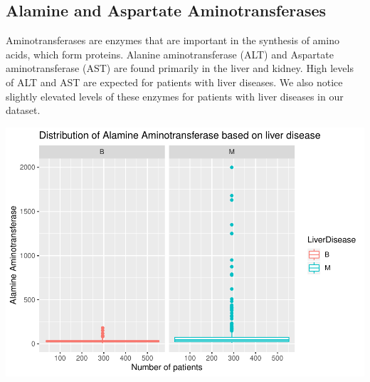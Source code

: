 \documentclass[]{article}
\newenvironment{Shaded}{\begin{snugshade}}{\end{snugshade}}
\newcommand{\CommentTok}[1]{\textcolor[rgb]{0.56,0.35,0.01}{\textit{#1}}}
\newcommand{\DataTypeTok}[1]{\textcolor[rgb]{0.13,0.29,0.53}{#1}}
\newcommand{\KeywordTok}[1]{\textcolor[rgb]{0.13,0.29,0.53}{\textbf{#1}}}
\newcommand{\NormalTok}[1]{#1}
\newcommand{\OperatorTok}[1]{\textcolor[rgb]{0.81,0.36,0.00}{\textbf{#1}}}
\newcommand{\StringTok}[1]{\textcolor[rgb]{0.31,0.60,0.02}{#1}}
\begin{document}
\subsection{Alamine and Aspartate Aminotransferases}

Aminotransferases are enzymes that are important in the synthesis of
amino acids, which form proteins. Alanine aminotransferase (ALT) and
Aspartate aminotransferase (AST) are found primarily in the liver and
kidney. High levels of ALT and AST are expected for patients with liver
diseases. We also notice slightly elevated levels of these enzymes for
patients with liver diseases in our dataset.

\begin{Shaded}
\end{Shaded}

\includegraphics{LiverDisease_files/figure-latex/unnamed-chunk-18-1.pdf}
\end{document}
